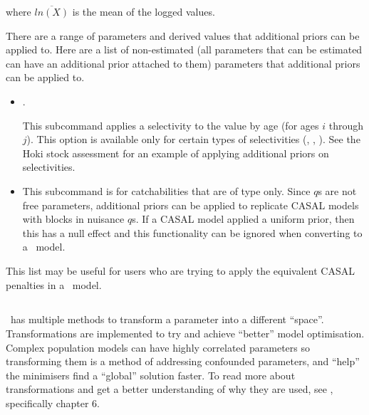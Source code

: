 where $\overline{ln\left(X\right)}$ is the mean of the logged values.

There are a range of parameters and derived values that additional priors can be applied to. Here are a list of non-estimated (all parameters that can be estimated can have an additional prior attached to them) parameters that additional priors can be applied to.

\begin{itemize}
	\item {}.

	This subcommand applies a selectivity to the value by age (for ages $i$ through $j$). This option is available only for certain types of selectivities (, , ). See the Hoki stock assessment for an example of applying additional priors on selectivities.

	\item {}

	This subcommand is for catchabilities that are of type  only. Since  $q$s are not free parameters, additional priors can be applied to replicate CASAL models with  blocks in nuisance $q$s. If a CASAL model applied a uniform prior, then this has a null effect and this functionality can be ignored when converting to a \CNAME\ model.
\end{itemize}

This list may be useful for users who are trying to apply the equivalent CASAL penalties in a \CNAME\ model.

\subsection{\label{sec:Transformation}}
\CNAME\ has multiple methods to transform a parameter into a different \enquote{space}. Transformations are implemented to try and achieve \enquote{better} model optimisation. Complex population models can have highly correlated parameters so transforming them is a method of addressing confounded parameters, and \enquote{help} the minimisers find a \enquote{global} solution faster. To read more about transformations and get a better understanding of why they are used, see \cite{gilks1995markov}, specifically chapter 6.


